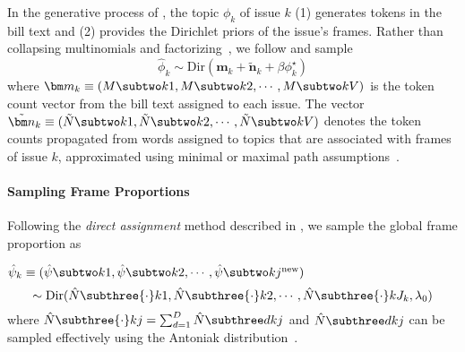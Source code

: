 In the generative process of \name{}, the topic $\phi_k$ of issue $k$ (1)
generates tokens in the bill text and (2) provides the Dirichlet priors of the
issue's frames. Rather than collapsing multinomials and factorizing~\cite{hu-12:fttm},
we follow  and sample
\begin{equation}
  \hat{\phi}_k \sim \mbox{Dir} (\bm m_k + \tilde{\bm n}_k + \beta \phi_k^{\star})
  \label{eq:phi_samp}
\end{equation}
where $\bm m_k \equiv (M \subtwo k1, M \subtwo k2, \cdots, M \subtwo
kV)$ is the token count vector from the bill text assigned to each
issue. The vector $\tilde{\bm n}_k \equiv (\tilde{N} \subtwo k1,
\tilde{N} \subtwo k2, \cdots, \tilde{N} \subtwo kV)$ denotes the token
counts propagated from words assigned to topics that are associated
with frames of issue $k$, approximated using minimal or maximal path
assumptions~\cite{Cowans:PhD06,Wallach:PhD08}.

\paragraph{Sampling Frame Proportions}

Following the \textit{direct assignment} method described in , we sample the global frame proportion as 

$\hat{\psi}_k \equiv (\hat{\psi} \subtwo k1, \hat{\psi} \subtwo k2, \cdots, \hat{\psi} \subtwo k{j^{\mbox{\scriptsize new}}})$
\begin{equation}
 \sim \mbox{Dir} (\hat{N} \subthree {\cdot}k1, \hat{N} \subthree {\cdot}k2,
 \cdots, \hat{N} \subthree {\cdot}k{J_k}, \lambda_0)
\end{equation}
where $\hat{N} \subthree {\cdot}kj = \sum_{d=1}^D \hat{N} \subthree dkj$ and $\hat{N} \subthree
dkj$ can be sampled effectively using the Antoniak distribution~\cite{Aantoniak:AS74}.





